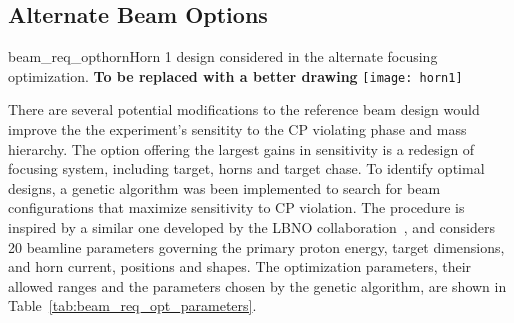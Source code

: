 \subsection{Alternate Beam Options}
\label{subsec:alternative-focusing-systems}
\begin{cdrfigure}{beam_req_opthorn}{Horn 1 design considered 
    in the alternate focusing optimization. \bf{To be replaced with a 
      better drawing}}
  \texttt{[image: horn1]}
\end{cdrfigure}
There are several potential modifications to the reference beam design would improve the
the experiment's sensitity to the CP violating phase and mass hierarchy.  
The option offering the largest gains in sensitivity is a redesign of 
focusing system, including target, horns and target chase.  To identify optimal
designs, a genetic algorithm was been implemented to search
for beam configurations that maximize sensitivity to CP violation.
The procedure is inspired by a similar one developed by the
LBNO collaboration~\cite{LBNO}, and considers 20 beamline
parameters governing the primary proton energy, target dimensions, and
horn current, positions and shapes.   The optimization parameters,
their allowed ranges and the parameters chosen by the genetic
algorithm, are shown in Table~\ref{tab:beam_req_opt_parameters}.
